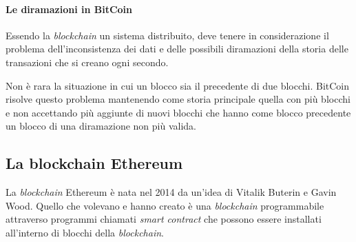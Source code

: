 \paragraph{Le diramazioni in BitCoin}
Essendo la \textit{blockchain} un sistema distribuito, deve tenere in considerazione il problema dell'inconsistenza dei dati e delle possibili diramazioni della storia delle transazioni che si creano ogni secondo.

Non è rara la situazione in cui un blocco sia il precedente di due blocchi. BitCoin risolve questo problema mantenendo come storia principale quella con più blocchi e non accettando più aggiunte di nuovi blocchi che hanno come blocco precedente un blocco di una diramazione non più valida.





\subsection{La blockchain Ethereum}
La \textit{blockchain} Ethereum è nata nel 2014 da un'idea di Vitalik Buterin e Gavin Wood. Quello che volevano e hanno creato è una \textit{blockchain} programmabile attraverso programmi chiamati \textit{smart contract} che possono essere installati all'interno di blocchi della \textit{blockchain}. \\

